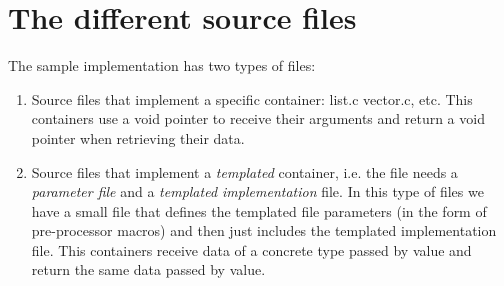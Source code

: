 \documentclass[12pt,a4paper]{memoir} %
\begin{document}
{{\section{The different source files}

The sample implementation has two types of files:
\begin{enumerate}
\item Source files that implement a specific container: list.c vector.c, etc. This containers use a void pointer to receive their arguments and return
a void pointer when retrieving their data.
\item Source files that implement a \textsl{templated} container, i.e. the file needs a \textsl{parameter file} and a \textsl{templated implementation} 
file. In this type of files we have a small file that defines the templated file parameters (in the form of pre-processor macros) and then just 
includes the templated implementation file. This containers receive data of a concrete type passed by value and return the same data passed by value.
\end{enumerate}

}}
\end{document}
